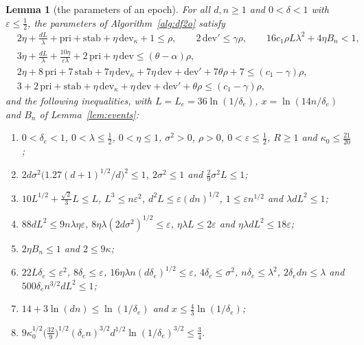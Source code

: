 \documentclass[11pt]{amsart}
\newtheorem{lemma}[theorem]{Lemma}
\theoremstyle{definition}
\numberwithin{equation}{section}
\begin{document}
\begin{lemma}[the parameters of an epoch]\label{lem:rows}
For all $d,n\ge1$ and $0<\delta<1$ with $\varepsilon\le\frac12$, the parameters of Algorithm~\ref{alg:df2o} satisfy
\begin{align*}
&2\eta+\frac{dL}\lambda+\mathrm{pri}+\mathrm{stab}+\eta\,\mathrm{dev}_\kappa+1\le\rho, \qquad 2\,\mathrm{dev}'\le\gamma\rho,\qquad 16c_1\rho L\lambda^2+4\eta B_n<1,\\
&3\eta+\frac{dL}\lambda+\frac{10\eta}{\varepsilon\lambda}+2\,\mathrm{pri}+\eta\,\mathrm{dev}\le(\theta-\alpha)\rho,\\
&2\eta+8\,\mathrm{pri}+7\,\mathrm{stab}+7\eta\,\mathrm{dev}_\kappa+7\eta\,\mathrm{dev}+\mathrm{dev}'+7\theta\rho+7\le(c_1-\gamma)\rho,\\
&3+2\,\mathrm{pri}+\mathrm{stab}+\eta\,\mathrm{dev}_\kappa+\eta\,\mathrm{dev}+\mathrm{dev}'+\theta\rho\le(c_1-\gamma)\rho,
\end{align*}
and the following inequalities, with $L=L_e=36\ln(1/\delta_e)$, $x=\ln(14n/\delta_e)$ and $B_n$ of Lemma~\ref{lem:events}:
\begin{enumerate}[label=(\roman*)]
\item $0<\delta_e<1$, $0<\lambda\le\frac12$, $0<\eta\le1$, $\sigma^2>0$, $\rho>0$, $0<\varepsilon\le\frac12$, $R\ge1$ and $\kappa_0\le\frac{21}{20}$;
\item $2d\sigma^2\bigl(1.27(d+1)^{1/2}/d\bigr)^2\le1$, $2\sigma^2\le1$ and $\frac29\sigma^2L\le1$;
\item $10L^{1/2}+\frac{\sqrt2}3L\le L$, $L^3\le n\varepsilon^2$, $d^2L\le\varepsilon(dn)^{1/2}$, $1\le\varepsilon n^{1/2}$ and $\lambda dL^2\le1$;
\item $88dL^2\le9n\lambda\eta\varepsilon$, $8\eta\lambda(2d\sigma^2)^{1/2}\le\varepsilon$, $\eta\lambda L\le2\varepsilon$ and $\eta\lambda dL^2\le18\varepsilon$;
\item $2\eta B_n\le1$ and $2\le9\kappa$;
\item $22L\delta_e\le\varepsilon^2$, $8\delta_e\le\varepsilon$, $16\eta\lambda n(d\delta_e)^{1/2}\le\varepsilon$, $4\delta_e\le\sigma^2$, $n\delta_e\le\lambda^2$, $2\delta_edn\le\lambda$ and $500\delta_en^{3/2}dL^2\le1$;
\item $14+3\ln(dn)\le\ln(1/\delta_e)$ and $x\le\frac43\ln(1/\delta_e)$;
\item $9\kappa_0^{1/2}\bigl(\frac{32}9\bigr)^{1/2}(\delta_en)^{3/2}d^{1/2}\ln(1/\delta_e)^{3/2}\le\frac34$.
\end{enumerate}

\end{lemma}
\end{document}
